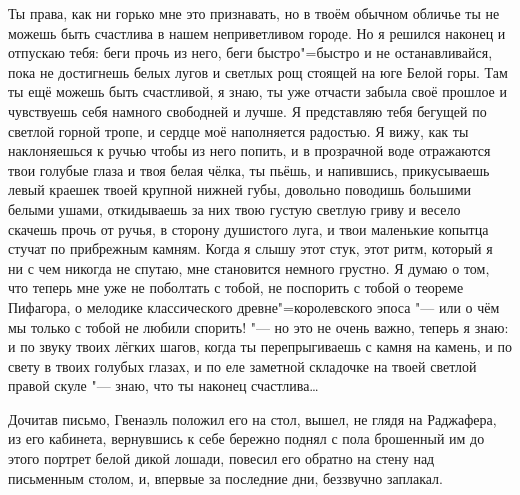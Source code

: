 Ты права, как ни горько мне это признавать, но в твоём обычном обличье ты не
можешь быть счастлива в нашем неприветливом городе.
Но я решился наконец и отпускаю тебя: беги прочь из него, беги быстро"=быстро и
не останавливайся, пока не достигнешь белых лугов и светлых рощ стоящей на юге
Белой горы.
Там ты ещё можешь быть счастливой, я знаю, ты уже отчасти забыла своё прошлое и
чувствуешь себя намного свободней и лучше.
Я представляю тебя бегущей по светлой горной тропе, и сердце моё наполняется
радостью.
Я вижу, как ты наклоняешься к ручью чтобы из него попить, и в прозрачной воде
отражаются твои голубые глаза и твоя белая чёлка, ты пьёшь, и напившись,
прикусываешь левый краешек твоей крупной нижней губы, довольно поводишь большими
белыми ушами, откидываешь за них твою густую светлую гриву и весело скачешь
прочь от ручья, в сторону душистого луга, и твои маленькие копытца стучат по
прибрежным камням.
Когда я слышу этот стук, этот ритм, который я ни с чем никогда не спутаю, мне
становится немного грустно.
Я думаю о том, что теперь мне уже не поболтать с тобой, не поспорить с тобой о
теореме Пифагора, о мелодике классического древне"=королевского эпоса "--- или о
чём мы только с тобой не любили спорить! "--- но это не очень важно, теперь я
знаю: и по звуку твоих лёгких шагов, когда ты перепрыгиваешь с камня на камень,
и по свету в твоих голубых глазах, и по еле заметной складочке на твоей светлой
правой скуле "--- знаю, что ты наконец счастлива\ldots

\medskip
Дочитав письмо, Гвенаэль положил его на стол, вышел, не глядя на Раджафера, из
его кабинета, вернувшись к себе бережно поднял с пола брошенный им до этого
портрет белой дикой лошади, повесил его обратно на стену над письменным столом,
и, впервые за последние дни, беззвучно заплакал.

